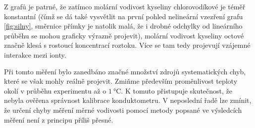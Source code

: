 \documentclass[0-protokol.tex]{subfiles}
\begin{document}
Z grafů je patrné, že zatímco molární vodivost kyseliny chlorovodíkové je téměř konstantní (čímž se dá také vysvětlit na první pohled nelineární vzezření grafu \ref{fig:silny}, směrnice přímky je natolik malá, že i drobné odchylky od lineárního průběhu se mohou graficky výrazně projevit), molární vodivost kyseliny octové značně klesá s rostoucí koncentrací roztoku. Více se tam tedy projevují vzájemné interakce mezi ionty.

Při tomto měření bylo zanedbáno značné množství zdrojů systematických chyb, které se však mohly reálně projevit. Zmiňme především proměnlivost teploty okolí v průběhu experimentu až o $\SI{1}{\celsius}$. K tomuto přistupuje skutečnost, že nebyla ověřena správnost kalibrace konduktometru. V neposlední řadě lze zmínit, že určení chyby měření měrné vodivosti pomocí metody popsané ve výsledcích měření není z principu příliš přesné.
\end{document}

